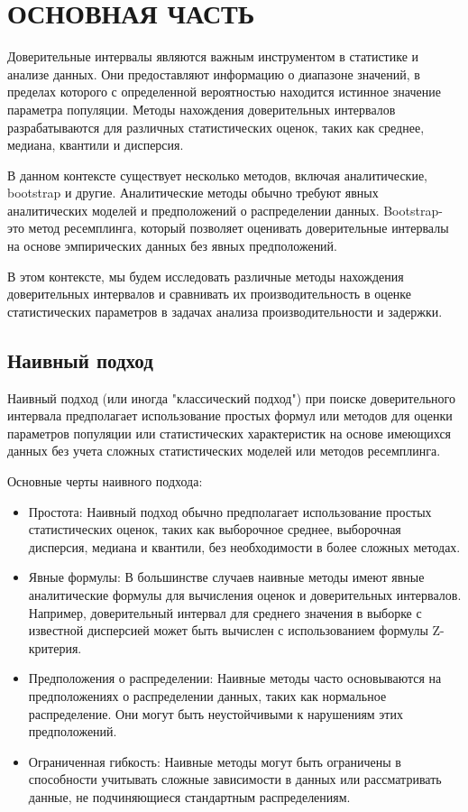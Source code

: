 \documentclass[specialist,
               substylefile = spbu_report.rtx,
               subf,href,colorlinks=true, 12pt]{disser}
\begin{document}
\newpage
\section{ОСНОВНАЯ ЧАСТЬ}
Доверительные интервалы являются важным инструментом в статистике и анализе данных. Они предоставляют информацию о диапазоне значений, в пределах которого с определенной вероятностью находится истинное значение параметра популяции. Методы нахождения доверительных интервалов разрабатываются для различных статистических оценок, таких как среднее, медиана, квантили и дисперсия.

В данном контексте существует несколько методов, включая аналитические, bootstrap и другие. Аналитические методы обычно требуют явных аналитических моделей и предположений о распределении данных. Bootstrap- это метод ресемплинга, который позволяет оценивать доверительные интервалы на основе эмпирических данных без явных предположений.

В этом контексте, мы будем исследовать различные методы нахождения доверительных интервалов и сравнивать их производительность в оценке статистических параметров в задачах анализа производительности и задержки.

\subsection{Наивный подход}

Наивный подход (или иногда "классический подход") при поиске доверительного интервала предполагает использование простых формул или методов для оценки параметров популяции или статистических характеристик на основе имеющихся данных без учета сложных статистических моделей или методов ресемплинга.

Основные черты наивного подхода:
\begin{itemize}
    \item Простота: Наивный подход обычно предполагает использование простых статистических оценок, таких как выборочное среднее, выборочная дисперсия, медиана и квантили, без необходимости в более сложных методах.
    \item Явные формулы: В большинстве случаев наивные методы имеют явные аналитические формулы для вычисления оценок и доверительных интервалов. Например, доверительный интервал для среднего значения в выборке с известной дисперсией может быть вычислен с использованием формулы Z-критерия.
    \item Предположения о распределении: Наивные методы часто основываются на предположениях о распределении данных, таких как нормальное распределение. Они могут быть неустойчивыми к нарушениям этих предположений.
    \item Ограниченная гибкость: Наивные методы могут быть ограничены в способности учитывать сложные зависимости в данных или рассматривать данные, не подчиняющиеся стандартным распределениям.
\end{itemize}
\end{document}
